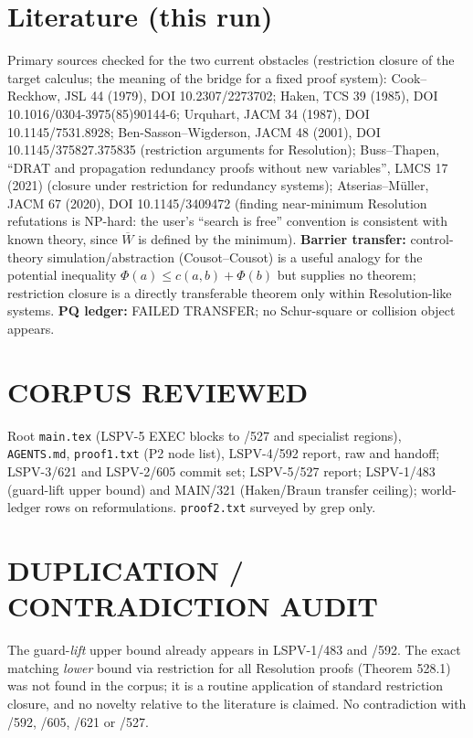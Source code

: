 \documentclass[11pt]{article}
\begin{document}
\section*{Literature (this run)}
Primary sources checked for the two current obstacles (restriction closure of the target calculus; the meaning of the
bridge for a fixed proof system): Cook--Reckhow, JSL 44 (1979), DOI 10.2307/2273702; Haken, TCS 39 (1985), DOI
10.1016/0304-3975(85)90144-6; Urquhart, JACM 34 (1987), DOI 10.1145/7531.8928; Ben-Sasson--Wigderson, JACM 48
(2001), DOI 10.1145/375827.375835 (restriction arguments for Resolution); Buss--Thapen, ``DRAT and propagation
redundancy proofs without new variables'', LMCS 17 (2021) (closure under restriction for redundancy systems);
Atserias--M\"uller, JACM 67 (2020), DOI 10.1145/3409472 (finding near-minimum Resolution refutations is NP-hard: the
user's ``search is free'' convention is consistent with known theory, since $\overline W$ is defined by the minimum).
\textbf{Barrier transfer:} control-theory simulation/abstraction (Cousot--Cousot) is a useful analogy for the potential
inequality $\Phi(a)\le c(a,b)+\Phi(b)$ but supplies no theorem; restriction closure is a directly transferable theorem
only within Resolution-like systems. \textbf{PQ ledger:} FAILED TRANSFER; no Schur-square or collision object appears.

\section*{CORPUS REVIEWED}
Root \texttt{main.tex} (LSPV-5 EXEC blocks to /527 and specialist regions), \texttt{AGENTS.md}, \texttt{proof1.txt}
(P2 node list), LSPV-4/592 report, raw and handoff; LSPV-3/621 and LSPV-2/605 commit set; LSPV-5/527 report;
LSPV-1/483 (guard-lift upper bound) and MAIN/321 (Haken/Braun transfer ceiling); world-ledger rows on
reformulations. \texttt{proof2.txt} surveyed by grep only.

\section*{DUPLICATION / CONTRADICTION AUDIT}
The guard-\emph{lift} upper bound already appears in LSPV-1/483 and /592. The exact matching \emph{lower} bound via
restriction for all Resolution proofs (Theorem 528.1) was not found in the corpus; it is a routine application of
standard restriction closure, and no novelty relative to the literature is claimed. No contradiction with /592,
/605, /621 or /527.
\end{document}
